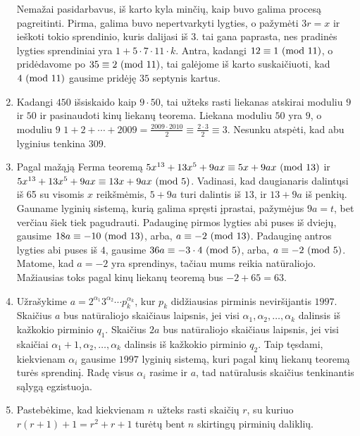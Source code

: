 \begin{enumerate}
Nemažai pasidarbavus, iš karto kyla minčių, kaip buvo galima procesą
pagreitinti. Pirma, galima buvo nepertvarkyti lygties, o pažymėti
$3r = x$ ir ieškoti tokio sprendinio, kuris dalijasi iš $3$. tai gana
paprasta, nes pradinės lygties sprendiniai yra $1 + 5 \cdot 7 \cdot 11 \cdot
k$. Antra, kadangi $12 \equiv 1 \ (\text{mod } 11)$, o pridėdavome po $35\equiv
2\ (\text{mod } 11)$, tai galėjome iš karto suskaičiuoti, kad $4 \ (\text{mod } 11)$ gausime pridėję
$35$ septynis kartus. 
\item 
Kadangi $450$ išsiskaido kaip $9\cdot 50$, tai užteks rasti liekanas
atskirai moduliu $9$ ir $50$ ir pasinaudoti kinų liekanų teorema.
Liekana moduliu $50$ yra $9$, o moduliu $9$ 
$1+2+\cdots+2009=\frac{2009\cdot2010}{2} \equiv \frac{2\cdot
3}{2} \equiv 3$. Nesunku atspėti, kad abu lyginius tenkina $309$.
\item 
Pagal mažąją Ferma teoremą $5x^{13} + 13 x^5 +9ax \equiv 5x + 9ax
\ (\text{mod } 13)$ ir $5x^{13} + 13 x^5 +9ax \equiv 13x + 9ax \ (\text{mod } 5)$. Vadinasi,
kad daugianaris dalintųsi iš 65 su visomis $x$ reikšmėmis, $5+9a$ turi
dalintis iš $13$, ir $13+9a$ iš penkių. Gauname lyginių sistemą, kurią
galima spręsti įprastai, pažymėjus $9a=t$, bet verčiau šiek tiek
pagudrauti. Padauginę pirmos lygties abi puses iš dviejų, gausime
$18a \equiv -10 \ (\text{mod } 13)$, arba, $a \equiv -2 \ (\text{mod } 13)$. Padauginę antros
lygties abi puses iš $4$, gausime $36a \equiv -3\cdot 4\ (\text{mod } 5)$, arba,
$a \equiv -2\ (\text{mod } 5)$. Matome, kad $a=-2$ yra sprendinys, tačiau mums
reikia natūraliojo. Mažiausias toks pagal kinų liekanų teoremą bus
$-2+65 = 63$.
\item 
Užrašykime $a = 2^{\alpha_1}3^{\alpha_2} \cdots p_k^{\alpha_k}$, kur
$p_k$ didžiausias pirminis neviršijantis $1997$.
Skaičius $a$ bus natūraliojo skaičiaus laipsnis, jei visi $\alpha_1,
\alpha_2, \dots, \alpha_k$ dalinsis iš kažkokio pirminio $q_1$.
Skaičius $2a$ bus natūraliojo skaičiaus laipsnis, jei visi skaičiai
$\alpha_1 +1, \alpha_2, \dots, \alpha_k$ dalinsis iš kažkokio pirminio
$q_2$. Taip tęsdami, kiekvienam $\alpha_i$ gausime $1997$ lyginių
sistemą, kuri pagal kinų liekanų teoremą turės sprendinį. Radę visus
$\alpha_i$ rasime ir $a$, tad natūralusis skaičius tenkinantis sąlygą
egzistuoja.
\item 
Pastebėkime, kad kiekvienam $n$ užteks rasti skaičių $r$, su kuriuo
$r(r+1)+1=r^2 + r + 1$ turėtų bent $n$ skirtingų pirminių daliklių. 


\end{enumerate}
